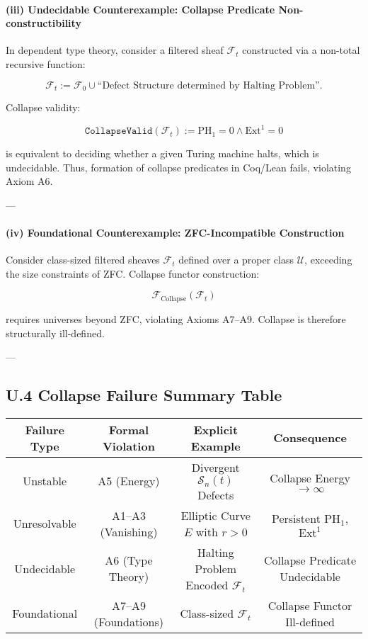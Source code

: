 \documentclass[11pt]{article}
\begin{document}
\paragraph{(iii) Undecidable Counterexample: Collapse Predicate Non-constructibility}

In dependent type theory, consider a filtered sheaf $\mathcal{F}_t$ constructed via a non-total recursive function:

\[
\mathcal{F}_t := \mathcal{F}_0 \cup \text{``Defect Structure determined by Halting Problem''}.
\]

Collapse validity:

\[
\texttt{CollapseValid}(\mathcal{F}_t) := \mathrm{PH}_1 = 0 \wedge \mathrm{Ext}^1 = 0
\]

is equivalent to deciding whether a given Turing machine halts, which is undecidable.  
Thus, formation of collapse predicates in Coq/Lean fails, violating Axiom A6.

---

\paragraph{(iv) Foundational Counterexample: ZFC-Incompatible Construction}

Consider class-sized filtered sheaves $\mathcal{F}_t$ defined over a proper class $\mathcal{U}$, exceeding the size constraints of ZFC.  
Collapse functor construction:

\[
\mathcal{F}_{\mathrm{Collapse}}(\mathcal{F}_t)
\]

requires universes beyond ZFC, violating Axioms A7–A9.  
Collapse is therefore structurally ill-defined.

---

\subsection*{U.4 Collapse Failure Summary Table}

\begin{center}
\begin{tabular}{|c|c|c|c|}
\hline
\textbf{Failure Type} & \textbf{Formal Violation} & \textbf{Explicit Example} & \textbf{Consequence} \\
\hline
Unstable & A5 (Energy) & Divergent $\mathcal{S}_n(t)$ Defects & Collapse Energy $\to \infty$ \\
Unresolvable & A1–A3 (Vanishing) & Elliptic Curve $E$ with $r>0$ & Persistent $\mathrm{PH}_1$, $\mathrm{Ext}^1$ \\
Undecidable & A6 (Type Theory) & Halting Problem Encoded $\mathcal{F}_t$ & Collapse Predicate Undecidable \\
Foundational & A7–A9 (Foundations) & Class-sized $\mathcal{F}_t$ & Collapse Functor Ill-defined \\
\hline
\end{tabular}
\end{center}
\end{document}
